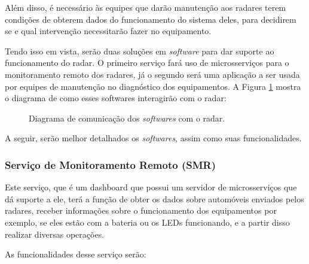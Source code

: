 Além disso, é necessário às equipes que darão manutenção aos radares terem condições de obterem dados do funcionamento do sistema deles, para decidirem se e qual intervenção necessitarão fazer no equipamento.

Tendo isso em vista, serão duas soluções em \emph{software} para dar suporte ao funcionamento do radar. O primeiro serviço fará uso de microsserviços para o monitoramento remoto dos radares, já o segundo será uma aplicação a ser usada por equipes de manutenção no diagnóstico dos equipamentos. A Figura \ref{fig:diagrama-in-out-software} mostra o diagrama de como esses softwares interagirão com o radar:

\begin{figure}[!htb]
    \caption{\label{fig:diagrama-in-out-software} Diagrama de comunicação dos \emph{softwares} com o radar.}
\end{figure}

 A seguir, serão melhor detalhados os \emph{softwares}, assim como suas funcionalidades.

\subsubsection{Serviço de Monitoramento Remoto (SMR)}
Este serviço, que é um dashboard que possui um servidor de microsserviços que dá suporte a ele, terá a função de obter os dados sobre automóveis enviados pelos radares, receber informações sobre o funcionamento dos equipamentos por exemplo, se eles estão com a bateria ou os LEDs funcionando, e a partir disso realizar diversas operações.

As funcionalidades desse serviço serão:

